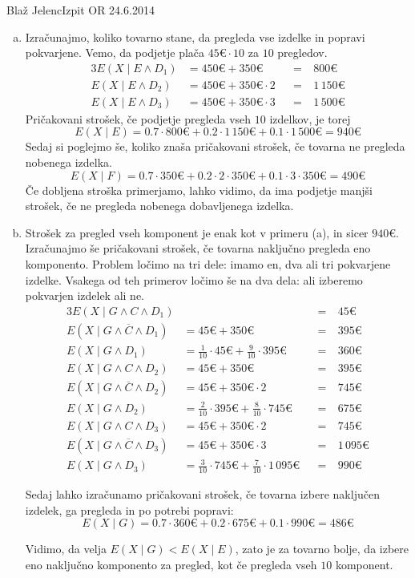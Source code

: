 \begin{naloga}{Blaž Jelenc}{Izpit OR 24.6.2014}
\begin{odgovor}
\begin{enumerate}[(a)]
\item Izračunajmo, koliko tovarno stane,
da pregleda vse izdelke in popravi po\-kva\-rje\-ne.
Vemo, da podjetje plača $45 € \cdot 10$ za $10$ pregledov.
\begin{alignat*}{3}
E(X \mid E \land D_1) &= 450 € + 350 € &&=&\ 800 € \\
E(X \mid E \land D_2) &= 450 € + 350 € \cdot 2 &&=&\ 1\,150 € \\
E(X \mid E \land D_3) &= 450 € + 350 € \cdot 3 &&=&\ 1\,500 €
\end{alignat*}
Pričakovani strošek, če podjetje pregleda vseh $10$ izdelkov, je torej
$$
E(X \mid E) = 0.7 \cdot 800 € + 0.2 \cdot 1\,150 € + 0.1 \cdot 1\,500 € = 940 €
$$
Sedaj si poglejmo še, koliko znaša pričakovani strošek,
če tovarna ne pregleda nobenega izdelka.
$$
E(X \mid F) = 0.7 \cdot 350 € + 0.2 \cdot 2 \cdot 350 € + 0.1 \cdot 3 \cdot 350 € = 490 €
$$
Če dobljena stroška primerjamo, lahko vidimo,
da ima podjetje manjši strošek, če ne pregleda nobenega dobavljenega izdelka.

\item Strošek za pregled vseh komponent je enak kot v primeru (a),
in sicer $940 €$.
Izračunajmo še pričakovani strošek,
če tovarna naključno pregleda eno komponento.
Problem ločimo na tri dele:
imamo en, dva ali tri pokvarjene izdelke.
Vsakega od teh primerov ločimo še na dva dela:
ali izberemo pokvarjen izdelek ali ne.
\begin{alignat*}{3}
E(X \mid G \land C \land D_1) &&&=&\ 45 € \\
E(X \mid G \land \overline{C} \land D_1) &= 45 € + 350 € &&=&\ 395 € \\
E(X \mid G \land D_1) &= \frac{1}{10} \cdot 45 € + \frac{9}{10} \cdot 395 €
&&=&\ 360 € \\[1ex]
E(X \mid G \land C \land D_2) &= 45 € + 350 € &&=&\ 395 € \\
E(X \mid G \land \overline{C} \land D_2) &= 45 € + 350 € \cdot 2 &&=&\ 745 € \\
E(X \mid G \land D_2) &= \frac{2}{10} \cdot 395 € + \frac{8}{10} \cdot 745 €
&&=&\ 675 € \\[1ex]
E(X \mid G \land C \land D_3) &= 45 € + 350 € \cdot 2 &&=&\ 745 € \\
E(X \mid G \land \overline{C} \land D_3) &= 45 € + 350 € \cdot 3 &&=&\ 1\,095 € \\
E(X \mid G \land D_3) &= \frac{3}{10} \cdot 745 € + \frac{7}{10} \cdot 1\,095 €
&&=&\ 990 €
\end{alignat*}

Sedaj lahko izračunamo pričakovani strošek,
če tovarna izbere naključen izdelek,
ga pregleda in po potrebi popravi:
$$
E(X \mid G) = 0.7 \cdot 360 € + 0.2 \cdot 675 € + 0.1 \cdot 990 € = 486 €
$$

Vidimo, da velja $E(X \mid G) < E(X \mid E)$,
zato je za tovarno bolje, da izbere eno naključno komponento za pregled,
kot če pregleda vseh $10$ komponent.
\end{enumerate}
\end{odgovor}
\end{naloga}
